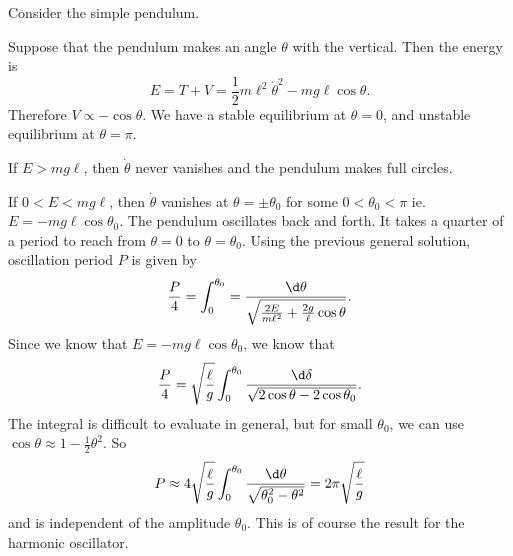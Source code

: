 \documentclass[a4paper]{article}
\begin{document}
\begin{eg}
  Consider the simple pendulum.
  \begin{center}
  \end{center}
  Suppose that the pendulum makes an angle $\theta$ with the vertical. Then the energy is
  \[
    E = T + V = \frac{1}{2}m\ell^2 \dot{\theta}^2 - mg\ell \cos\theta.
  \]
  Therefore $V\propto -\cos\theta$. We have a stable equilibrium at $\theta = 0 $, and unstable equilibrium at $\theta = \pi$.
  \begin{center}
  \end{center}
  If $E > mg\ell$, then $\dot{\theta}$ never vanishes and the pendulum makes full circles.

  If $0 < E < mg\ell$, then $\dot{\theta}$ vanishes at $\theta = \pm \theta_0$ for some $0 < \theta_0 < \pi$ ie. $E = -mg\ell \cos\theta_0$. The pendulum oscillates back and forth. It takes a quarter of a period to reach from $\theta = 0$ to $\theta = \theta_0$. Using the previous general solution, oscillation period $P$ is given by
  \[
    \frac{P}{4} = \int_0^{\theta_0} = \frac{\d \theta}{\sqrt{\frac{2E}{m\ell^2} + \frac{2g}{\ell }\cos\theta}}.
  \]
  Since we know that $E = -mg\ell \cos \theta_0$, we know that
  \[
    \frac{P}{4} = \sqrt{\frac{\ell}{g}}\int_0^{\theta_0} \frac{\d \delta}{\sqrt{2\cos\theta - 2\cos\theta_0}}.
  \]
  The integral is difficult to evaluate in general, but for small $\theta_0$, we can use $\cos\theta \approx 1 - \frac{1}{2}\theta^2$. So
  \[
    P \approx 4\sqrt{\frac{\ell}{g}}\int_0^{\theta_0}\frac{\d \theta}{\sqrt{\theta_0^2 - \theta^2}} = 2\pi\sqrt{\frac{\ell}{g}}
  \]
  and is independent of the amplitude $\theta_0$. This is of course the result for the harmonic oscillator.
\end{eg}
\end{document}
